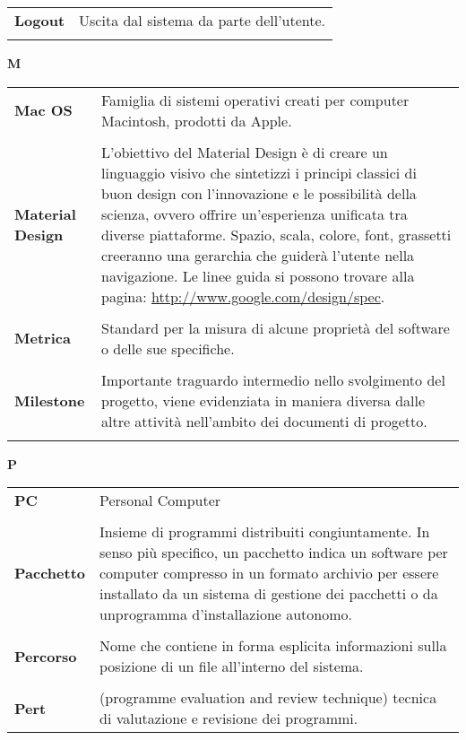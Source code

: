 {\begin{longtable}{L{4cm} p{10cm}}
\textbf{Logout} & Uscita dal sistema da parte dell’utente. \\ 
 \\ 
\end{longtable} 
\newpage 
{} 
{} 
\hfill\Huge{\textbf{M}} \\ 
\normalsize 
\begin{longtable}{L{4cm} p{10cm}}
\textbf{Mac OS} & Famiglia di sistemi operativi creati per computer Macintosh, prodotti da Apple. \\ 
 \\ 
\textbf{Material Design} & L’obiettivo del Material Design è di creare un linguaggio visivo che sintetizzi i principi classici di buon design con l’innovazione e le possibilità della scienza, ovvero offrire un’esperienza unificata tra diverse piattaforme. Spazio, scala, colore, font, grassetti creeranno una gerarchia che guiderà l’utente nella navigazione. Le linee guida si possono trovare alla pagina: \url{http://www.google.com/design/spec}. \\ 
 \\ 
\textbf{Metrica} & Standard per la misura di alcune proprietà del software o delle sue specifiche. \\ 
 \\ 
\textbf{Milestone} & Importante traguardo intermedio nello svolgimento del progetto, viene evidenziata in maniera diversa dalle altre attività nell'ambito dei documenti di progetto. \\ 
 \\ 
\end{longtable} 
\newpage 
{} 
{} 
\hfill\Huge{\textbf{P}} \\ 
\normalsize 
\begin{longtable}{L{4cm} p{10cm}}
\textbf{PC} & Personal Computer \\ 
 \\ 
\textbf{Pacchetto} & Insieme di programmi distribuiti congiuntamente. In senso più specifico, un pacchetto indica un software per computer compresso in un formato archivio per essere installato da un sistema di gestione dei pacchetti o da unprogramma d'installazione autonomo. \\ 
 \\ 
\textbf{Percorso} & Nome che contiene in forma esplicita informazioni sulla posizione di un file all'interno del sistema. \\ 
 \\ 
\textbf{Pert} & (programme evaluation and review technique) tecnica di valutazione e revisione dei programmi. \\ 

\end{longtable}}
